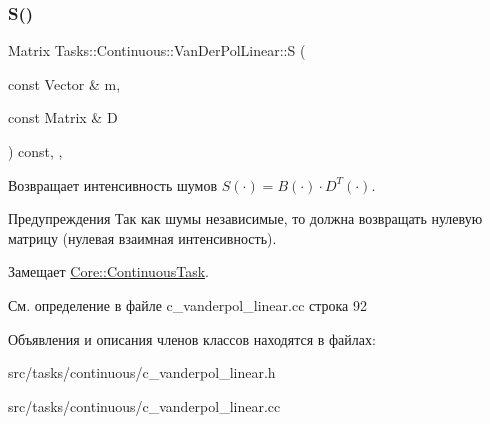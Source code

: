 \hypertarget{class_tasks_1_1_continuous_1_1_van_der_pol_linear_aa6cb67403faa3c2f894988aead527234}{}\label{class_tasks_1_1_continuous_1_1_van_der_pol_linear_aa6cb67403faa3c2f894988aead527234} 
\subsubsection{\texorpdfstring{S()}{S()}}
{\footnotesize\ttfamily Matrix Tasks\+::\+Continuous\+::\+Van\+Der\+Pol\+Linear\+::S (\begin{DoxyParamCaption}\item[{const Vector \&}]{m,  }\item[{const Matrix \&}]{D }\end{DoxyParamCaption}) const\hspace{0.3cm}{\ttfamily [override]}, {\ttfamily [protected]}, {\ttfamily [virtual]}}



Возвращает интенсивность шумов $S(\cdot) = B(\cdot) \cdot D^T(\cdot)$. 

\begin{DoxyWarning}{Предупреждения}
Так как шумы независимые, то должна возвращать нулевую матрицу (нулевая взаимная интенсивность). 
\end{DoxyWarning}


Замещает \hyperlink{class_core_1_1_continuous_task_aa6d652b655628586aeeda03348f633c5}{Core\+::\+Continuous\+Task}.



См. определение в файле c\+\_\+vanderpol\+\_\+linear.\+cc строка 92



Объявления и описания членов классов находятся в файлах\+:\begin{DoxyCompactItemize}
\item 
src/tasks/continuous/c\+\_\+vanderpol\+\_\+linear.\+h\item 
src/tasks/continuous/c\+\_\+vanderpol\+\_\+linear.\+cc\end{DoxyCompactItemize}
